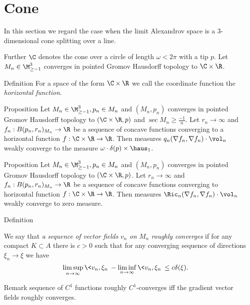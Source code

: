 
\section{Cone}

In this section we regard the case when the limit Alexandrov space
is a 3-dimensional cone splitting over a line.

Further $\C$ denotes the cone over a circle of length  $\omega<2\pi$
with a tip $p$.
Let $M_n\in\M_{\ge -1}^3$ converges in pointed
Gromov Hausdorff topology to $\C\times\R$.

\begin{thm}{Definition}
For a space of the form  $\C\times\R$
we call the
coordinate function   
the \emph{horizontal function}. 
\end{thm}

\begin{thm}{Proposition}
Let $M_n\in\M_{\ge -1}^3, p_n\in M_n$ and $(M_n,p_n)$ converges in pointed
Gromov Hausdorff topology to $(\C\times\R, p)$
and $\operatorname{sec}M_n\ge\frac{-1}{n}$.
Let $r_n\to\infty$ and $f_n:B(p_n,r_n)_{M_n}\to \R$ be a sequence of concave
functions 
converging to a horizontal function $f:\C\times\R\to\R$.
Then measures $q_n(\nabla f_n, \nabla f_n)\cdot\vol_n$
weakly converge to the measure $\omega\cdot\delta(p)\times \haus_1$.

\end{thm}

\begin{thm}{Proposition}
Let $M_n\in\M_{\ge -1}^3, p_n\in M_n$ and $(M_n,p_n)$ converges in pointed
Gromov Hausdorff topology to $(\C\times\R, p)$.
Let $r_n\to\infty$ and $f_n:B(p_n,r_n)_{M_n}\to \R$ be a sequence of concave
functions 
converging to horizontal function $f:\C\times\R\to\R$.
Then measures $\Ric_n(\nabla f_n, \nabla f_n)\cdot\vol_n$
weakly converge to zero measure.

\end{thm}



\begin{thm}{Definition}

We say that \emph {a sequence of vector fields $v_n$ on $M_n$ roughly converges }
if for any compact $K\subset A$ there is $c>0$ such that
for any converging sequence of directions $\xi_n\to\xi$
we have
$$\limsup_{n\to\infty} \<v_n,\xi_n\>-
 \liminf_{n\to\infty} \<v_n,\xi_n\>\le
 c\delta(\xi).
 $$
\end{thm}

\begin{thm}{Remark}
sequence of $C^1$ functions roughly $C^1$-converges
iff the gradient vector fields
roughly converges.

\end{thm}


